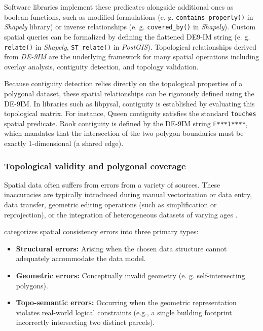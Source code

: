 \documentclass[
  english,
  12pt,
  a4paper,
]{article}
\providecommand{\tightlist}{%
  \setlength{\itemsep}{0pt}\setlength{\parskip}{0pt}}
\begin{document}
Software libraries implement these predicates alongside additional ones
as boolean functions, such as modified formulations (e. g.
\texttt{contains\_properly()} in \emph{Shapely} library) or inverse
relationships (e. g. \texttt{covered\_by()} in \emph{Shapely}). Custom
spatial queries can be formalized by defining the flattened DE9-IM
string (e. g. \texttt{relate()} in \emph{Shapely}, \texttt{ST\_relate()}
in \emph{PostGIS}). Topological relationships derived from \emph{DE-9IM}
are the underlying framework for many spatial operations including
overlay analysis, contiguity detection, and topology validation.

Because contiguity detection relies directly on the topological
properties of a polygonal dataset, these spatial relationships can be
rigorously defined using the DE-9IM. In libraries such as libpysal,
contiguity is established by evaluating this topological matrix. For
instance, Queen contiguity satisfies the standard \texttt{touches}
spatial predicate. Rook contiguity is defined by the DE-9IM string
\texttt{F***1****}, which mandates that the intersection of the two
polygon boundaries must be exactly 1-dimensional (a shared edge).

\subsubsection{Topological validity and polygonal
coverage}\label{topological-validity-and-polygonal-coverage}

Spatial data often suffers from errors from a variety of sources. These
inaccuracies are typically introduced during manual vectorization or
data entry, data transfer, geometric editing operations (such as
simplification or reprojection), or the integration of heterogeneous
datasets of varying ages \citep[\citet{gisgeography_topology},
\citet{servigne2000}]{spatialeye_topology}.

\citet{servigne2000} categorizes spatial consistency errors into three
primary types:

\begin{itemize}
\tightlist
\item
  \textbf{Structural errors:} Arising when the chosen data structure
  cannot adequately accommodate the data model.
\item
  \textbf{Geometric errors:} Conceptually invalid geometry (e. g.
  self-intersecting polygons).
\item
  \textbf{Topo-semantic errors:} Occurring when the geometric
  representation violates real-world logical constraints (e.g., a single
  building footprint incorrectly intersecting two distinct parcels).
\end{itemize}
\end{document}
